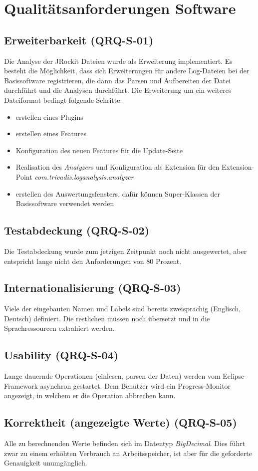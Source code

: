 \section{Qualitätsanforderungen Software}
\subsection{Erweiterbarkeit (QRQ-S-01)}
Die Analyse der JRockit Dateien wurde als Erweiterung implementiert. Es besteht die Möglichkeit, dass sich Erweiterungen für andere Log-Dateien bei der Basissoftware registrieren, die dann das Parsen und Aufbereiten der Datei durchführt und die Analysen durchführt. Die Erweiterung um ein weiteres Dateiformat bedingt folgende Schritte:
\begin{itemize}
\item erstellen eines Plugins
\item erstellen eines Features
\item Konfiguration des neuen Features für die Update-Seite
\item Realisation des \textit{Analyzer}s und Konfiguration als Extension für den Extension-Point \textit{com.trivadis.loganalysis.analyzer}
\item erstellen des Auswertungsfensters, dafür können Super-Klassen der Basissoftware verwendet werden
\end{itemize}

\subsection{Testabdeckung (QRQ-S-02)}
Die Testabdeckung wurde zum jetzigen Zeitpunkt noch nicht ausgewertet, aber entspricht lange nicht den Anforderungen von 80 Prozent.
\subsection{Internationalisierung (QRQ-S-03)}
Viele der eingebauten Namen und Labels sind bereits zweisprachig (Englisch, Deutsch) definiert. Die restlichen müssen noch übersetzt und in die Sprachressourcen extrahiert werden.

\subsection{Usability (QRQ-S-04)}
Lange dauernde Operationen (einlesen, parsen der Daten) werden vom Eclipse-Framework asynchron gestartet. Dem Benutzer wird ein Progress-Monitor angezeigt, in welchem er die Operation abbrechen kann.

\subsection{Korrektheit (angezeigte Werte) (QRQ-S-05)}
Alle zu berechnenden Werte befinden sich im Datentyp \textit{BigDecimal}. Dies führt zwar zu einem erhöhten Verbrauch an Arbeitsspeicher, ist aber für die geforderte Genauigkeit unumgänglich.